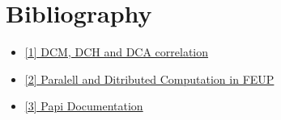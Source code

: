 \section{Bibliography}


\begin{itemize}
    \item \href{https://ptools-perfapi.eecs.utk.narkive.com/csjsZ0V2/dca-less-than-dch-and-dcm}{[1] DCM, DCH and DCA correlation}
    \item \href{https://moodle.up.pt/pluginfile.php/201904/mod_resource/content/1/CPD_blockMatrixMult.pdf}{[2] Paralell and Ditributed Computation in FEUP}
    \item \href{https://flozz.github.io/pypapi/events.html}{[3] Papi Documentation}
    
\end{itemize}
